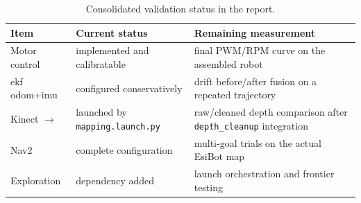 \begin{table}[H]
        \centering
        \caption{Consolidated validation status in the report.}
        \label{tab:metrics_consolidated}
        \begin{tabularx}{\linewidth}{L{4cm} L{4cm} L{4cm}}
                \toprule
                \textbf{Item} & \textbf{Current status} & \textbf{Remaining measurement} \\
                \midrule
                Motor control & implemented and calibratable & final PWM/RPM curve on the assembled robot \\
                \gls{ekf} odom+\gls{imu} & configured conservatively & drift before/after fusion on a repeated trajectory \\
                Kinect $\to$  & launched by \texttt{mapping.launch.py} & raw/cleaned depth comparison after \texttt{depth\_cleanup} integration \\
                Nav2 & complete configuration & multi-goal trials on the actual EsiBot map \\
                Exploration & dependency added & launch orchestration and frontier testing \\
                \bottomrule
        \end{tabularx}
\end{table}
